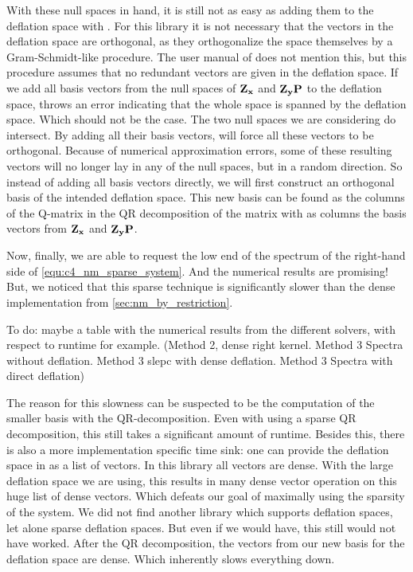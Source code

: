 With these null spaces in hand, it is still not as easy as adding them to the deflation space with \slepc. For this library it is not necessary that the vectors in the deflation space are orthogonal, as they orthogonalize the space themselves by a Gram-Schmidt-like procedure. The user manual of \slepc does not mention this, but this procedure assumes that no redundant vectors are given in the deflation space. If we add all basis vectors from the null spaces of $\vb{Z_x}$ and $\vb{Z_y}\vb{P}$ to the deflation space, \slepc throws an error indicating that the whole space is spanned by the deflation space. Which should not be the case. The two null spaces we are considering do intersect. By adding all their basis vectors, \slepc will force all these vectors to be orthogonal. Because of numerical approximation errors, some of these resulting vectors will no longer lay in any of the null spaces, but in a random direction. So instead of adding all basis vectors directly, we will first construct an orthogonal basis of the intended deflation space. This new basis can be found as the columns of the Q-matrix in the QR decomposition of the matrix with as columns the basis vectors from $\vb{Z_x}$ and $\vb{Z_y} \vb{P}$.

Now, finally, we are able to request the low end of the spectrum of the right-hand side of \eqref{equ:c4_nm_sparse_system}. And the numerical results are promising! But, we noticed that this sparse technique is significantly slower than the dense implementation from \ref{sec:nm_by_restriction}.

{\color{red} To do: maybe a table with the numerical results from the different solvers, with respect to runtime for example. (Method 2, dense right kernel. Method 3 Spectra without deflation. Method 3 slepc with dense deflation. Method 3 Spectra with direct deflation)}

The reason for this slowness can be suspected to be the computation of the smaller basis with the QR-decomposition. Even with using a sparse QR decomposition, this still takes a significant amount of runtime. Besides this, there is also a more implementation specific time sink: one can provide the deflation space in \slepc as a list of vectors. In this library all vectors are dense. With the large deflation space we are using, this results in many dense vector operation on this huge list of dense vectors. Which defeats our goal of maximally using the sparsity of the system. We did not find another library which supports deflation spaces, let alone sparse deflation spaces. But even if we would have, this still would not have worked. After the QR decomposition, the vectors from our new basis for the deflation space are dense. Which inherently slows everything down.

